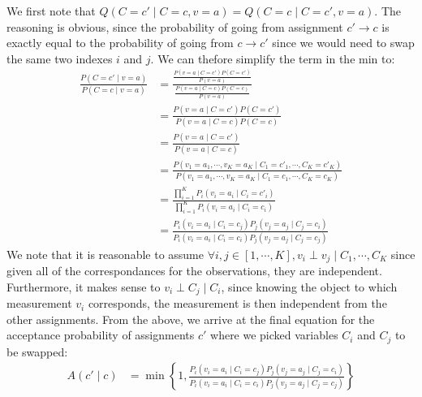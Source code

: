 \documentclass[12pt]{article}
\begin{document}
\begin{enumerate}[label=(\alph*)]
  We first note that $Q(C = c' \mid C = c, v = a) = Q(C = c \mid C = c', v = a)$. The reasoning is obvious, since the probability of going from assignment $c' \to c$ is exactly equal to the probability of going from $c \to c'$ since we would need to swap the same two indexes $i$ and $j$. We can thefore simplify the term in the min to:
  \begin{align*}
  	\frac{P(C = c' \mid v = a)}{P(C = c \mid v = a)} &= \frac{\frac{P(v= a \mid C = c')P(C = c')}{P(v = a)}}{\frac{P(v= a \mid C = c)P(C = c)}{P(v = a)}} \tag{Bayes Rule} \\
  	&= \frac{P(v = a \mid C = c')P(C = c')}{P(v = a \mid C = c)P(C = c)} \tag{Normalization Cancels}\\
  	&= \frac{P(v = a \mid C = c')}{P(v = a \mid C = c)}\tag{We assume uniform prior over all possible assignments, so $P(C = c') = P(C = c)$} \\
  	&= \frac{P(v_1 = a_1, \cdots, v_K = a_K \mid C_1 = c'_1, \cdots, C_K = c'_K)}{P(v_1 = a_1, \cdots, v_K = a_K \mid C_1 = c_1, \cdots, C_K = c_K)} \\
  	&= \frac{\prod_{i=1}^K P_i(v_i = a_i \mid C_i = c'_i )}{\prod_{i=1}^K P_i(v_i = a_i \mid C_i = c_i )} \tag{We assume that $\forall i,j \in [1,\cdots, K], v_i \perp v_j \mid C_1, \cdots, C_K$ and $v_i \perp C_j \mid C_i$} \\
  	&= \frac{P_i(v_i = a_i \mid C_i = c_j)P_j(v_j = a_j \mid C_j = c_i)}{P_i(v_i = a_i \mid C_i = c_i)P_j(v_j = a_j \mid C_j = c_j)} \tag{Since we know that $c'$ and $c$ differ only by the swapped $i,j$ assigments}
  \end{align*}
  We note that it is reasonable to assume $\forall i,j \in [1,\cdots, K], v_i \perp v_j \mid C_1, \cdots, C_K$ since given all of the correspondances for the observations, they are independent. Furthermore, it makes sense to $v_i \perp C_j \mid C_i$, since knowing the object to which measurement $v_i$ corresponds, the measurement is then independent from the other assignments. From the above, we arrive at the final equation for the acceptance probability of assignments $c'$ where we picked variables $C_i$ and $C_j$ to be swapped:
  \begin{align*}
  A(c' \mid c) &= \min\left\{1, \frac{P_i(v_i = a_i \mid C_i = c_j)P_j(v_j = a_j \mid C_j = c_i)}{P_i(v_i = a_i \mid C_i = c_i)P_j(v_j = a_j \mid C_j = c_j)} \right\}
  \end{align*}


\end{enumerate}
\end{document}
